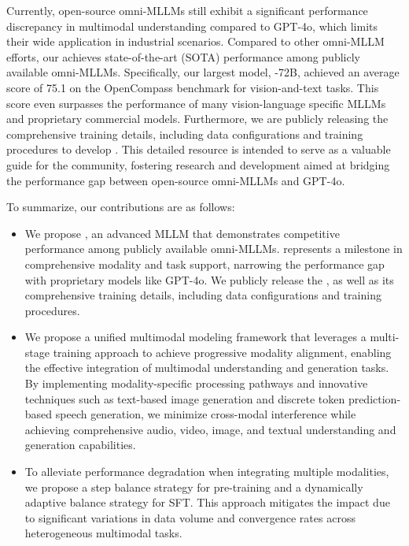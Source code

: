 Currently,  open-source omni-MLLMs still exhibit a significant performance discrepancy in multimodal understanding compared to GPT-4o, which limits their wide application in industrial scenarios. Compared to other omni-MLLM efforts, our \method achieves state-of-the-art (SOTA) performance among publicly available omni-MLLMs. Specifically, our largest model, \method-72B, achieved an average score of 75.1 on the OpenCompass benchmark for vision-and-text tasks. This score even surpasses the performance of many vision-language specific MLLMs and proprietary commercial models.  Furthermore, we are publicly releasing the comprehensive training details, including data configurations and training procedures to develop \method. This detailed resource is intended to serve as a valuable guide for the community,  fostering research and development aimed at bridging the performance gap between open-source omni-MLLMs and GPT-4o.

To summarize, our contributions are as follows:

\begin{itemize}
    \item We propose \method, an advanced MLLM that demonstrates competitive performance among publicly available omni-MLLMs. \method represents a milestone in comprehensive modality and task support, narrowing the performance gap with proprietary models like GPT-4o. We publicly release the \method, as well as its comprehensive training details, including data configurations and training procedures.
    \item We propose a unified multimodal modeling framework that leverages a multi-stage training approach to achieve progressive modality alignment, enabling the effective integration of multimodal understanding and generation tasks.
    By implementing modality-specific processing pathways and innovative techniques such as text-based image generation and discrete token prediction-based speech generation, we minimize cross-modal interference while achieving comprehensive audio, video, image, and textual understanding and generation capabilities.
    \item To alleviate performance degradation when integrating multiple modalities, we propose a step balance strategy for pre-training and a dynamically adaptive balance strategy for SFT. This approach mitigates the impact due to significant variations in data volume and convergence rates across heterogeneous multimodal tasks.
\end{itemize}


